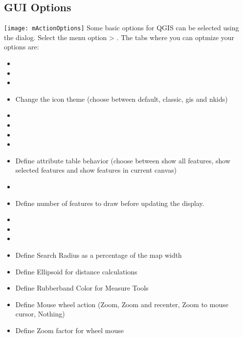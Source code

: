 \subsection{GUI Options}
\label{subsec:gui_options}
\texttt{[image: mActionOptions]} 
Some basic options for QGIS
can be selected using the  dialog. Select the 
menu option  >
 . The tabs where you can 
optmize your options are:


\begin{itemize}
\item {}
\item {}
\item {}
\item Change the icon theme (choose between default, classic, gis and nkids)
\item {}
\item {}
\item {}
\item {}
\item Define attribute table behavior (choose between show all features, show 
selected features and show features in current canvas)
\end{itemize}


\begin{itemize}
\item {}
\item Define number of features to draw before updating the display.
\item {}
\item {}
\item {} 
\end{itemize}


\begin{itemize}
\item Define Search Radius as a percentage of the map width
\item Define Ellipsoid for distance calculations
\item Define Rubberband Color for Measure Tools
\item Define Mouse wheel action (Zoom, Zoom and recenter, Zoom to mouse cursor, Nothing)
\item Define Zoom factor for wheel mouse
\end{itemize}

